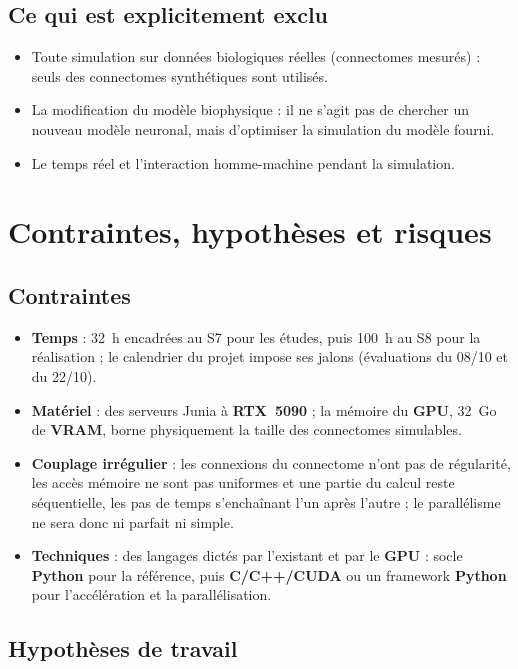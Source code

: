 \documentclass{report}
\begin{document}
\section{Ce qui est explicitement exclu}

\begin{itemize}
    \item Toute simulation sur données biologiques réelles (connectomes mesurés) : seuls des connectomes synthétiques sont utilisés.
    \item La modification du modèle biophysique : il ne s'agit pas de chercher un nouveau modèle neuronal, mais d'optimiser la simulation du modèle fourni.
    \item Le temps réel et l'interaction homme-machine pendant la simulation.
\end{itemize}

\chapter{Contraintes, hypothèses et risques}

\section{Contraintes}

\begin{itemize}
    \item \textbf{Temps} : 32~h encadrées au S7 pour les études, puis 100~h au S8 pour la réalisation ; le calendrier du projet impose ses jalons (évaluations du 08/10 et du 22/10).
    \item \textbf{Matériel} : des serveurs Junia à \textbf{RTX~5090} ; la mémoire du \textbf{GPU}, 32~Go de \textbf{VRAM}, borne physiquement la taille des connectomes simulables.
    \item \textbf{Couplage irrégulier} : les connexions du connectome n'ont pas de régularité, les accès mémoire ne sont pas uniformes et une partie du calcul reste séquentielle, les pas de temps s'enchaînant l'un après l'autre ; le parallélisme ne sera donc ni parfait ni simple.
    \item \textbf{Techniques} : des langages dictés par l'existant et par le \textbf{GPU} : socle \textbf{Python} pour la référence, puis \textbf{C/C++/CUDA} ou un framework \textbf{Python} pour l'accélération et la parallélisation.
\end{itemize}

\section{Hypothèses de travail}
\end{document}
